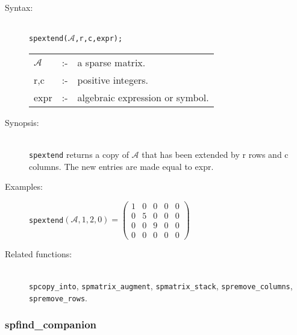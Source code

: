 \begin{description}
\item[Syntax:]\mbox{}\\
 \texttt{spextend($\mathcal{A}$,r,c,expr);}\\[2mm]
\begin{tabular}{l l l}
$\mathcal{A}$ &:-& a sparse matrix. \\
r,c        &:-& positive integers. \\
expr      &:-& algebraic expression or symbol.
\end{tabular}

\item[Synopsis:]\mbox{}\\
                \texttt{spextend} returns a copy of $\mathcal{A}$ that has been
                extended by r rows and c columns. The new entries are
                made equal to expr.

\item[Examples:]
\texttt{spextend}\((\mathcal{A},1,2,0) =
\begin{pmatrix} 1 & 0 & 0 & 0 & 0 \\ 0 & 5 & 0 & 0 & 0
\\ 0 & 0 & 9 & 0 & 0 \\ 0 & 0 & 0 & 0 & 0
\end{pmatrix}\)

\item[Related functions:]\mbox{}\\
\texttt{spcopy\_into}, \texttt{spmatrix\_augment},
\texttt{spmatrix\_stack}, \texttt{spremove\_columns}, \texttt{spremove\_rows}.

\end{description}


\subsubsection{spfind\_companion}
\label{sparse:spfind_companion}
\hypertarget{operator:SPFIND_COMPANION}{}

